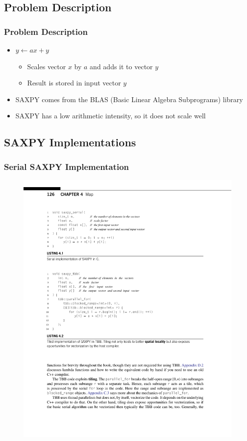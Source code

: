 \documentclass[xcolor=dvipsnames]{beamer}
\begin{document}
	\subsection{Problem Description}
		\begin{frame} \frametitle{Problem Description}
            \begin{itemize}
                \item $y \leftarrow ax + y$
                    \begin{itemize}
                        \item Scales vector $x$ by $a$ and adds it to vector 
                        $y$ 
                        \item Result is stored in input vector $y$
                    \end{itemize}
                \item SAXPY comes from the BLAS (Basic Linear Algebra 
                Subprograms) library
                \item SAXPY has a low arithmetic intensity, so it does not 
                scale well
            \end{itemize}
		\end{frame}
	
	\subsection{SAXPY Implementations}
		\begin{frame} \frametitle{Serial SAXPY Implementation}
			\begin{figure}
				\centering
				\includegraphics[width=115mm]{images/listing-4-1.pdf}
			\end{figure}
		\end{frame}
		
\end{document}
